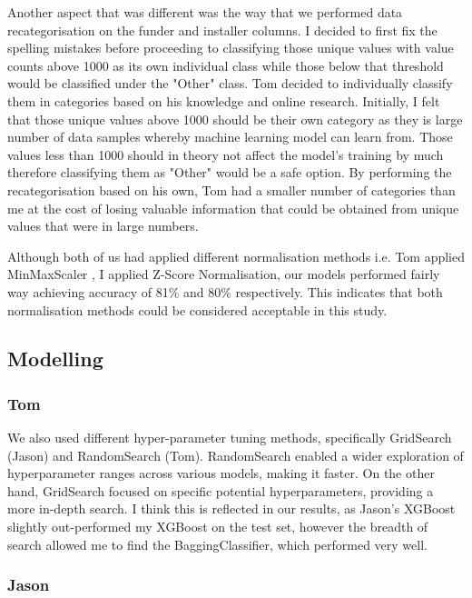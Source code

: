 \documentclass[conference]{IEEEtran}
\begin{document}
Another aspect that was different was the way that we performed data recategorisation on the funder and installer columns. I decided to first fix the spelling mistakes before proceeding to classifying those unique values with value counts above 1000 as its own individual class while those below that threshold would be classified under the "Other" class. Tom decided to individually classify them in categories based on his knowledge and online research. Initially, I felt that those unique values above 1000 should be their own category as they is large number of data samples whereby machine learning model can learn from. Those values less than 1000 should in theory not affect the model's training by much therefore classifying them as "Other" would be a safe option. By performing the recategorisation based on his own, Tom had a smaller number of categories than me at the cost of losing valuable information that could be obtained from unique values that were in large numbers.

Although both of us had applied different normalisation methods i.e. Tom applied MinMaxScaler , I applied Z-Score Normalisation, our models performed fairly way achieving accuracy of 81\% and 80\% respectively. This indicates that both normalisation methods could be considered acceptable in this study.

\subsection{Modelling}

\subsubsection{Tom}

We also used different hyper-parameter tuning methods, specifically GridSearch (Jason) and RandomSearch (Tom). RandomSearch enabled a wider exploration of hyperparameter ranges across various models, making it faster. On the other hand, GridSearch focused on specific potential hyperparameters, providing a more in-depth search. I think this is reflected in our results, as Jason's XGBoost slightly out-performed my XGBoost on the test set, however the breadth of search allowed me to find the BaggingClassifier, which performed very well.

\subsubsection{Jason}
\end{document}
